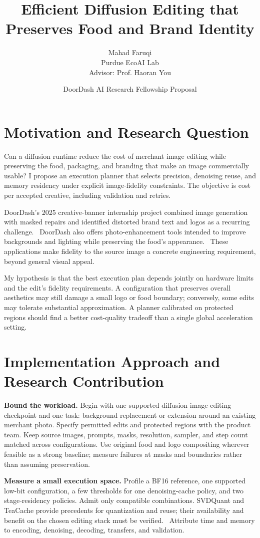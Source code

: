 \documentclass{article}
\title{Efficient Diffusion Editing that Preserves Food and Brand Identity}
\author{Mahad Faruqi \\
  Purdue EcoAI Lab \\
  Advisor: Prof. Haoran You}
\date{DoorDash AI Research Fellowship Proposal}
\begin{document}
\maketitle

\section{Motivation and Research Question}
Can a diffusion runtime reduce the cost of merchant image editing while preserving the food, packaging, and branding that make an image commercially usable? I propose an execution planner that selects precision, denoising reuse, and memory residency under explicit image-fidelity constraints. The objective is cost per accepted creative, including validation and retries.

DoorDash's 2025 creative-banner internship project combined image generation with masked repairs and identified distorted brand text and logos as a recurring challenge.~\citep{doordashBanner2025} DoorDash also offers photo-enhancement tools intended to improve backgrounds and lighting while preserving the food's appearance.~\citep{doordashPhotoTools2025} These applications make fidelity to the source image a concrete engineering requirement, beyond general visual appeal.

My hypothesis is that the best execution plan depends jointly on hardware limits and the edit's fidelity requirements. A configuration that preserves overall aesthetics may still damage a small logo or food boundary; conversely, some edits may tolerate substantial approximation. A planner calibrated on protected regions should find a better cost-quality tradeoff than a single global acceleration setting.

\section{Implementation Approach and Research Contribution}
\textbf{Bound the workload.} Begin with one supported diffusion image-editing checkpoint and one task: background replacement or extension around an existing merchant photo. Specify permitted edits and protected regions with the product team. Keep source images, prompts, masks, resolution, sampler, and step count matched across configurations. Use original food and logo compositing wherever feasible as a strong baseline; measure failures at masks and boundaries rather than assuming preservation.

\textbf{Measure a small execution space.} Profile a BF16 reference, one supported low-bit configuration, a few thresholds for one denoising-cache policy, and two stage-residency policies. Admit only compatible combinations. SVDQuant and TeaCache provide precedents for quantization and reuse; their availability and benefit on the chosen editing stack must be verified.~\citep{li2024svdquant,liu2024teacache} Attribute time and memory to encoding, denoising, decoding, transfers, and validation.
\end{document}
